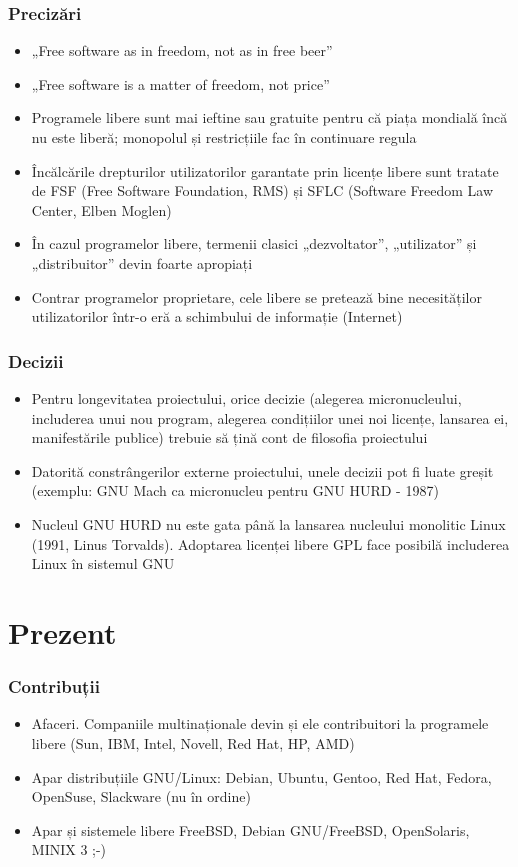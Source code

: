 \documentclass{beamer}
\begin{document}
\begin{frame}[allowframebreaks] %
\frametitle{Precizări}
\begin{itemize}

\item „Free software as in freedom, not as in free beer”
\item „Free software is a matter of freedom, not price”
\item Programele libere sunt mai ieftine sau gratuite pentru că piața mondială
încă nu este liberă; monopolul și restricțiile fac în continuare regula
\item Încălcările drepturilor utilizatorilor garantate prin licențe libere
sunt tratate de FSF (Free Software Foundation, RMS) și SFLC (Software Freedom Law
Center, Elben Moglen)
\item În cazul programelor libere, termenii clasici „dezvoltator”,
„utilizator” și „distribuitor” devin foarte apropiați
\item Contrar programelor proprietare, cele libere se pretează bine
necesităților utilizatorilor într-o eră a schimbului de informație (Internet)
\end{itemize}
\end{frame}

\begin{frame}[allowframebreaks] %
\frametitle{Decizii}
\begin{itemize}

\item Pentru longevitatea proiectului, orice decizie (alegerea micronucleului,
includerea unui nou program, alegerea condițiilor unei noi licențe, lansarea ei, 
manifestările publice) trebuie să țină cont de filosofia proiectului
\item Datorită constrângerilor externe proiectului, unele decizii pot fi luate greșit
(exemplu: GNU Mach ca micronucleu pentru GNU HURD - 1987)
\item Nucleul GNU HURD nu este gata până la lansarea nucleului monolitic Linux
(1991, Linus Torvalds). Adoptarea licenței libere GPL face posibilă includerea Linux
în sistemul GNU
\end{itemize}
\end{frame}

\section{Prezent}
\frame{\tableofcontents[currentsection]}
\begin{frame}[allowframebreaks] %
\frametitle{Contribuții}
\begin{itemize}
\item Afaceri. Companiile multinaționale devin și ele contribuitori la
programele libere (Sun, IBM, Intel, Novell, Red Hat, HP, AMD)
\item Apar distribuțiile GNU/Linux: Debian, Ubuntu, Gentoo, Red Hat, Fedora, 
OpenSuse, Slackware (nu în ordine)
\item Apar și sistemele libere FreeBSD, Debian GNU/FreeBSD,
OpenSolaris, MINIX 3 ;-)
\end{itemize}
\end{frame}
\end{document}
